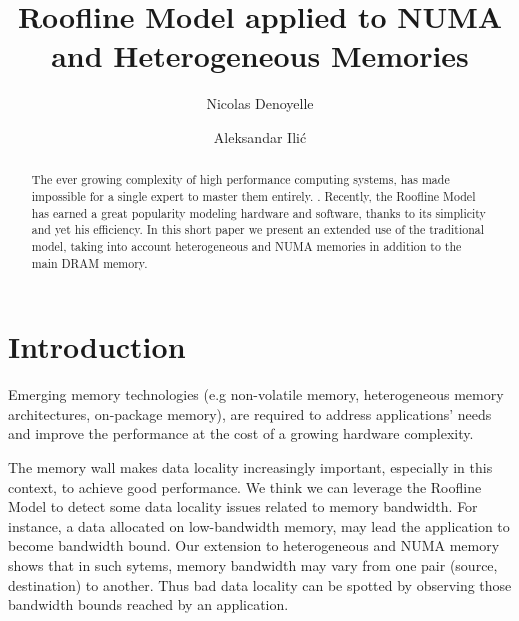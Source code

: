 \documentclass[runningheads,a4paper]{llncs}
\begin{document}
\title{Roofline Model applied to NUMA and Heterogeneous Memories}
\author{Nicolas Denoyelle \and Aleksandar Ili\'{c}}

\maketitle

\begin{abstract}
  The ever growing complexity of high performance computing systems, has made impossible for a single expert to master them
  entirely.
  .
  Recently, the Roofline Model has earned a great popularity modeling hardware and software, thanks to its simplicity and yet his
  efficiency. 
  In this short paper we present an extended use of the traditional model, taking into account heterogeneous and NUMA memories
  in addition to the main DRAM memory.
\end{abstract}

\section{Introduction}
Emerging memory technologies (e.g non-volatile memory, heterogeneous memory architectures, on-package 
memory), are required to address applications' needs and improve the performance at the cost of a growing hardware complexity.

The memory wall makes data locality increasingly important, especially in this context, to achieve good performance.
We think we can leverage the Roofline Model to detect some data locality issues related to memory bandwidth.
For instance, a data allocated on low-bandwidth memory, may lead the application to become bandwidth bound.
Our extension to heterogeneous and NUMA memory shows that in such sytems, memory bandwidth may vary from one pair
(source, destination) to another.
Thus bad data locality can be spotted by observing those bandwidth bounds reached by an application.
\end{document}
